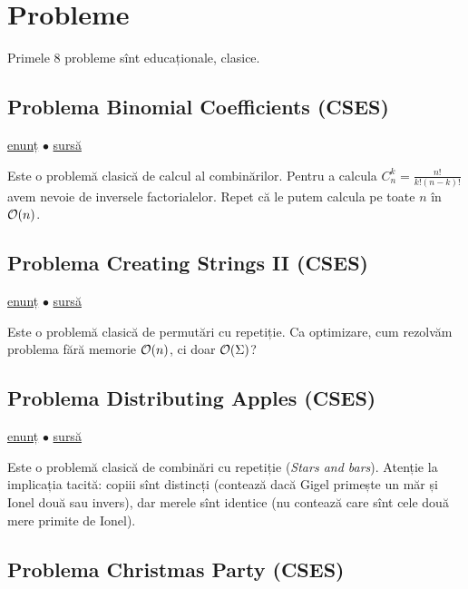 \documentclass[../main.tex]{subfiles}
\begin{document}
\section{Probleme}

Primele 8 probleme sînt educaționale, clasice.

\subsection{Problema Binomial Coefficients (CSES)}
\label{problem:binomial-coefficients}

\href{https://cses.fi/problemset/task/1079}{enunț}
$\bullet$
\hyperref[code:binomial-coefficients]{sursă}

Este o problemă clasică de calcul al combinărilor. Pentru a calcula $C_n^k = \frac{n!}{k!(n-k)!}$ avem nevoie de inversele factorialelor. Repet că le putem calcula pe toate $n$ în $\mathcal{O}(n)$.

\subsection{Problema Creating Strings II (CSES)}
\label{problem:creating-strings-2}

\href{https://cses.fi/problemset/task/1715}{enunț}
$\bullet$
\hyperref[code:creating-strings-2]{sursă}

Este o problemă clasică de permutări cu repetiție. Ca optimizare, cum rezolvăm problema fără memorie $\mathcal{O}(n)$, ci doar $\mathcal{O}(\Sigma)$?

\subsection{Problema Distributing Apples (CSES)}
\label{problem:distributing-apples}

\href{https://cses.fi/problemset/task/1716}{enunț}
$\bullet$
\hyperref[code:distributing-apples]{sursă}

Este o problemă clasică de combinări cu repetiție (\textit{Stars and bars}). Atenție la implicația tacită: copiii sînt distincți (contează dacă Gigel primește un măr și Ionel două sau invers), dar merele sînt identice (nu contează care sînt cele două mere primite de Ionel).

\subsection{Problema Christmas Party (CSES)}
\label{problem:christmas-party}
\end{document}
